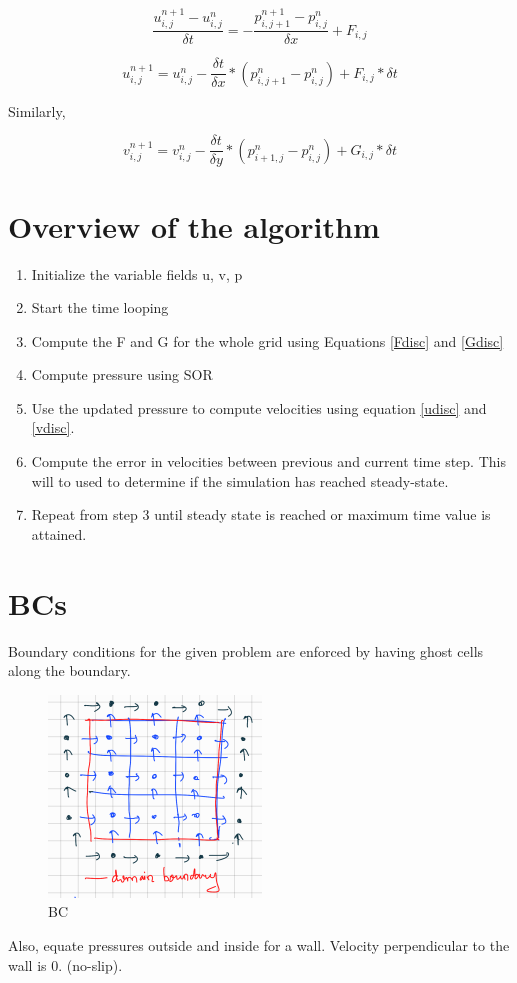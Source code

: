 \documentclass{article}
\begin{document}
\begin{equation}
    \frac{u_{i,j}^{n+1} - u_{i,j}^{n}}{\delta t} = -\frac{p_{i,j+1}^{n+1} - p_{i,j}^{n}}{\delta x} + F_{i,j}
\end{equation}

\begin{equation}\label{udisc}
    u_{i,j}^{n+1} = u_{i,j}^{n} -\frac{\delta t}{\delta x} * (p_{i,j+1}^{n} - p_{i,j}^{n}) + F_{i,j}*\delta t
\end{equation}

Similarly,

\begin{equation}\label{vdisc}
    v_{i,j}^{n+1} = v_{i,j}^{n} -\frac{\delta t}{\delta y} * (p_{i+1,j}^{n} - p_{i,j}^{n}) + G_{i,j}*\delta t
\end{equation}

\section{Overview of the algorithm}

\begin{enumerate}
\item Initialize the variable fields u, v, p
\item Start the time looping
\item Compute the F and G for the whole grid using Equations \ref{Fdisc} and \ref{Gdisc}
\item Compute pressure using SOR 
\item Use the updated pressure to compute velocities using equation \ref{udisc} and \ref{vdisc}.
\item Compute the error in velocities between previous and current time step. This will to used to determine if the simulation has reached steady-state.
\item Repeat from step 3 until steady state is reached or maximum time value is attained.

\end{enumerate}

\section{BCs}

Boundary conditions for the given problem are enforced by having ghost cells along the boundary.

\begin{figure}[H]
    \centering
    \includegraphics{bc.png}
    \caption{BC}
    \label{fig:BCs}
\end{figure}
Also, equate pressures outside and inside for a wall. Velocity perpendicular to the wall is 0. (no-slip).
\end{document}

